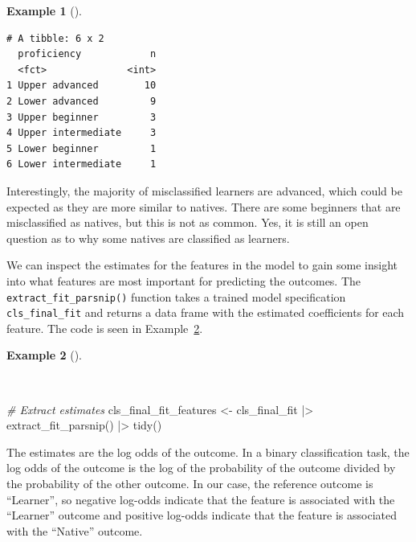 \documentclass[
  letterpaper,
]{book}
\newenvironment{Shaded}{\begin{snugshade}}{\end{snugshade}}
\newcommand{\CommentTok}[1]{\textcolor[rgb]{0.00,0.00,0.00}{\textit{#1}}}
\newcommand{\FunctionTok}[1]{\textcolor[rgb]{0.00,0.00,0.00}{#1}}
\newcommand{\NormalTok}[1]{\textcolor[rgb]{0.00,0.00,0.00}{#1}}
\newcommand{\OtherTok}[1]{\textcolor[rgb]{0.00,0.00,0.00}{#1}}
\newcommand{\SpecialCharTok}[1]{\textcolor[rgb]{0.00,0.00,0.00}{#1}}
\theoremstyle{definition}
\newtheorem{example}{Example}[chapter]
\theoremstyle{remark}
\begin{document}
\begin{example}[]
\begin{verbatim}
# A tibble: 6 x 2
  proficiency            n
  <fct>              <int>
1 Upper advanced        10
2 Lower advanced         9
3 Upper beginner         3
4 Upper intermediate     3
5 Lower beginner         1
6 Lower intermediate     1
\end{verbatim}

\end{example}

Interestingly, the majority of misclassified learners are advanced,
which could be expected as they are more similar to natives. There are
some beginners that are misclassified as natives, but this is not as
common. Yes, it is still an open question as to why some natives are
classified as learners.

We can inspect the estimates for the features in the model to gain some
insight into what features are most important for predicting the
outcomes. The \texttt{extract\_fit\_parsnip()} function takes a trained
model specification \texttt{cls\_final\_fit} and returns a data frame
with the estimated coefficients for each feature. The code is seen in
Example~\ref{exm-predict-class-tune-hyperparameters-evaluate-test-estimates}.

\begin{example}[]\protect\hypertarget{exm-predict-class-tune-hyperparameters-evaluate-test-estimates}{}\label{exm-predict-class-tune-hyperparameters-evaluate-test-estimates}

~

\begin{Shaded}
\begin{Highlighting}[]
\CommentTok{\# Extract estimates}
\NormalTok{cls\_final\_fit\_features }\OtherTok{\textless{}{-}}
\NormalTok{  cls\_final\_fit }\SpecialCharTok{|\textgreater{}}
  \FunctionTok{extract\_fit\_parsnip}\NormalTok{() }\SpecialCharTok{|\textgreater{}}
  \FunctionTok{tidy}\NormalTok{()}
\end{Highlighting}
\end{Shaded}

\end{example}

The estimates are the log odds of the outcome. In a binary
classification task, the log odds of the outcome is the log of the
probability of the outcome divided by the probability of the other
outcome. In our case, the reference outcome is ``Learner'', so negative
log-odds indicate that the feature is associated with the ``Learner''
outcome and positive log-odds indicate that the feature is associated
with the ``Native'' outcome.
\end{document}
